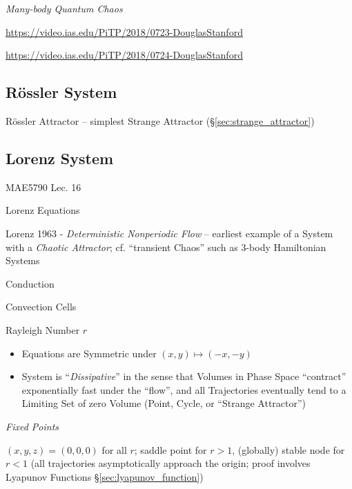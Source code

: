 \asterism


\emph{Many-body Quantum Chaos}

\url{https://video.ias.edu/PiTP/2018/0723-DouglasStanford}

\url{https://video.ias.edu/PiTP/2018/0724-DouglasStanford}



\subsection{R\"ossler System}\label{sec:rossler_system}

R\"ossler Attractor --
simplest Strange Attractor (\S\ref{sec:strange_attractor})



\subsection{Lorenz System}\label{sec:lorenz_system}

MAE5790 Lec. 16

Lorenz Equations

Lorenz 1963 - \emph{Deterministic Nonperiodic Flow} -- earliest example of a
System with a \emph{Chaotic Attractor}; cf. ``transient Chaos'' such as 3-body
Hamiltonian Systems

Conduction

Convection Cells

Rayleigh Number $r$

\begin{itemize}
  \item Equations are Symmetric under $(x,y) \mapsto (-x,-y)$
  \item System is ``\emph{Dissipative}'' in the sense that Volumes in Phase
    Space ``contract'' exponentially fast under the ``flow'', and all
    Trajectories eventually tend to a Limiting Set of zero Volume (Point, Cycle,
    or ``Strange Attractor'')
\end{itemize}

\emph{Fixed Points}

$(x,y,z) = (0,0,0)$ for all $r$; saddle point for $r > 1$, (globally) stable
node for $r < 1$ (all trajectories asymptotically approach the origin; proof
involves Lyapunov Functions \S\ref{sec:lyapunov_function})

